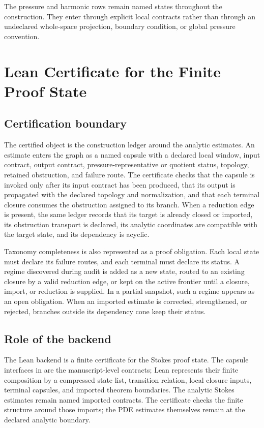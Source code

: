 \documentclass[11pt]{article}
\theoremstyle{plain}
\theoremstyle{definition}
\theoremstyle{remark}
\begin{document}
The pressure and harmonic rows remain named states throughout the construction.
They enter through explicit local contracts rather than through an undeclared
whole-space projection, boundary condition, or global pressure convention.

\section{Lean Certificate for the Finite Proof State}
\label{sec:lean}

\subsection{Certification boundary}
\label{sec:certification-boundary}

The certified object is the construction ledger around the analytic estimates.
An estimate enters the graph as a named capsule with a declared local window,
input contract, output contract, pressure-representative or quotient status,
topology, retained obstruction, and failure route.  The certificate checks that
the capsule is invoked only after its input contract has been produced, that
its output is propagated with the declared topology and normalization, and that
each terminal closure consumes the obstruction assigned to its branch.  When a
reduction edge is present, the same ledger records that its target is already
closed or imported, its obstruction transport is declared, its analytic
coordinates are compatible with the target state, and its dependency is
acyclic.

Taxonomy completeness is also represented as a proof obligation.  Each local
state must declare its failure routes, and each terminal must declare its
status.  A regime discovered during audit is added as a new state, routed to an
existing closure by a valid reduction edge, or kept on the active frontier
until a closure, import, or reduction is supplied.  In a partial snapshot, such
a regime appears as an open obligation.  When an imported estimate is
corrected, strengthened, or rejected, branches outside its dependency cone keep
their status.

\subsection{Role of the backend}
The Lean backend is a finite certificate for the Stokes proof state.  The
capsule interfaces in  are the manuscript-level
contracts; Lean represents their finite composition by a compressed state list,
transition relation, local closure inputs, terminal capsules, and imported
theorem boundaries.  The analytic Stokes estimates remain named imported
contracts.  The certificate checks the finite structure around those imports;
the PDE estimates themselves remain at the declared analytic boundary.
\end{document}
